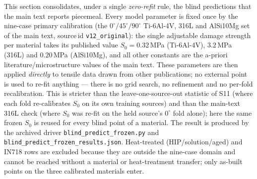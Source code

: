 \documentclass[11pt,a4paper,twocolumn]{article}
\begin{document}
This section consolidates, under a single \emph{zero-refit} rule, the blind predictions that the main
text reports piecemeal. Every model parameter is fixed once by the nine-case primary calibration
(the $0^\circ/45^\circ/90^\circ$ Ti-6Al-4V, 316L and AlSi10Mg set of the main text, source\,id
\texttt{v12\_original}): the single adjustable damage strength per material takes its published value
$S_0 = 0.32$\,MPa (Ti-6Al-4V), $3.2$\,MPa (316L) and $0.20$\,MPa (AlSi10Mg), and all other constants
are the a-priori literature/microstructure values of the main text. These parameters are then applied
\emph{directly} to tensile data drawn from other publications; no external point is used to re-fit
anything --- there is no grid search, no refinement and no per-fold recalibration. This is stricter than
the leave-one-source-out statistic of S11 (where each fold re-calibrates $S_0$ on its own training
sources) and than the main-text 316L check (where $S_0$ was re-fit on the held source's $0^\circ$ fold
alone); here the same frozen $S_0$ is reused for every blind point of a material. The result is produced
by the archived driver \texttt{blind\_predict\_frozen.py} and
\texttt{blind\_predict\_frozen\_results.json}. Heat-treated (HIP/solution/aged) and IN718 rows are excluded
because they are outside the nine-case domain and cannot be reached without a material or heat-treatment
transfer; only as-built points on the three calibrated materials enter.
\end{document}
